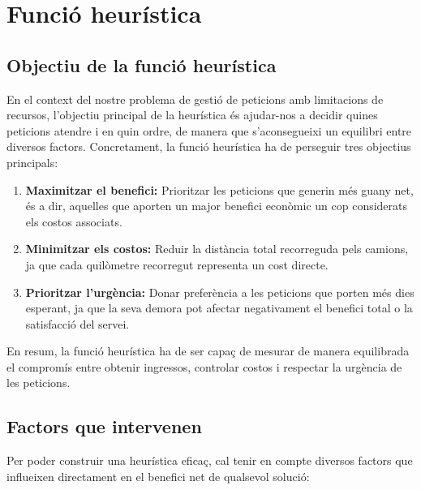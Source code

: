 \section{Funció heurística}
\label{sec:heuristic}

\vspace{0.5cm}

\subsection{Objectiu de la funció heurística}

En el context del nostre problema de gestió de peticions amb limitacions de recursos, l'objectiu principal de la heurística és ajudar-nos a decidir quines peticions atendre i en quin ordre, de manera que s’aconsegueixi un equilibri entre diversos factors. Concretament, la funció heurística ha de perseguir tres objectius principals:

\begin{enumerate}
\item \textbf{Maximitzar el benefici:} Prioritzar les peticions que generin més guany net, és a dir, aquelles que aporten un major benefici econòmic un cop considerats els costos associats.
\item \textbf{Minimitzar els costos:} Reduir la distància total recorreguda pels camions, ja que cada quilòmetre recorregut representa un cost directe.
\item \textbf{Prioritzar l'urgència:} Donar preferència a les peticions que porten més dies esperant, ja que la seva demora pot afectar negativament el benefici total o la satisfacció del servei.
\end{enumerate}

En resum, la funció heurística ha de ser capaç de mesurar de manera equilibrada el compromís entre obtenir ingressos, controlar costos i respectar la urgència de les peticions.

\vspace{0.5cm}

\subsection{Factors que intervenen}

Per poder construir una heurística eficaç, cal tenir en compte diversos factors que influeixen directament en el benefici net de qualsevol solució:

\vspace{0.5cm}

